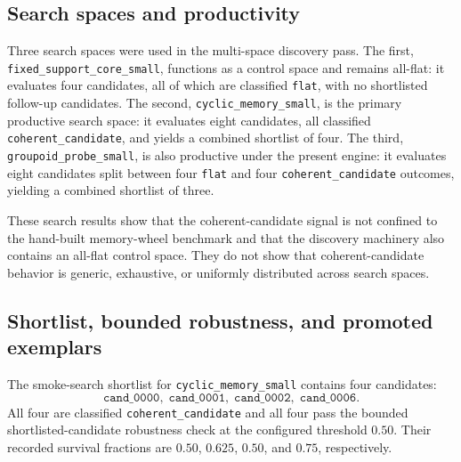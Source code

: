 \documentclass[11pt]{article}
\theoremstyle{definition}
\begin{document}
\subsection{Search spaces and productivity}\label{subsec:discovery-spaces}
Three search spaces were used in the multi-space discovery pass. The first, \texttt{fixed\_support\_core\_small}, functions as a control space and remains all-flat: it evaluates four candidates, all of which are classified \texttt{flat}, with no shortlisted follow-up candidates. The second, \texttt{cyclic\_memory\_small}, is the primary productive search space: it evaluates eight candidates, all classified \texttt{coherent\_candidate}, and yields a combined shortlist of four. The third, \texttt{groupoid\_probe\_small}, is also productive under the present engine: it evaluates eight candidates split between four \texttt{flat} and four \texttt{coherent\_candidate} outcomes, yielding a combined shortlist of three.

These search results show that the coherent-candidate signal is not confined to the hand-built memory-wheel benchmark and that the discovery machinery also contains an all-flat control space. They do not show that coherent-candidate behavior is generic, exhaustive, or uniformly distributed across search spaces.

\begin{table}[H]
\centering
\caption{Multi-space discovery summary from the tracked discovery note.}
\label{tab:discovery-multispace}
\footnotesize
\setlength{\tabcolsep}{4pt}
\end{table}

\subsection{Shortlist, bounded robustness, and promoted exemplars}\label{subsec:discovery-shortlist}
The smoke-search shortlist for \texttt{cyclic\_memory\_small} contains four candidates:
\[
\texttt{cand\_0000},\;
\texttt{cand\_0001},\;
\texttt{cand\_0002},\;
\texttt{cand\_0006}.
\]
All four are classified \texttt{coherent\_candidate} and all four pass the bounded shortlisted-candidate robustness check at the configured threshold $0.50$. Their recorded survival fractions are $0.50$, $0.625$, $0.50$, and $0.75$, respectively.
\end{document}

